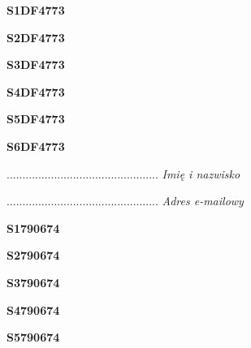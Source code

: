 \begin{turn}{90}\huge \textbf{S1DF4773}\end{turn}

\begin{turn}{90}\huge \textbf{S2DF4773}\end{turn}

\begin{turn}{90}\huge \textbf{S3DF4773}\end{turn}

\begin{turn}{90}\huge \textbf{S4DF4773}\end{turn}

\begin{turn}{90}\huge \textbf{S5DF4773}\end{turn}

\begin{turn}{90}\huge \textbf{S6DF4773}\end{turn}

\begin{turn}{90}\begin{minipage}{\linewidth} \vspace{20mm} ................................................  \textit{Imię i nazwisko}\end{minipage}\end{turn}

\begin{turn}{90}\begin{minipage}{\linewidth} \vspace{20mm} ................................................  \textit{Adres e-mailowy}\end{minipage}\end{turn}

\begin{turn}{90}\huge \textbf{S1790674}\end{turn}

\begin{turn}{90}\huge \textbf{S2790674}\end{turn}

\begin{turn}{90}\huge \textbf{S3790674}\end{turn}

\begin{turn}{90}\huge \textbf{S4790674}\end{turn}

\begin{turn}{90}\huge \textbf{S5790674}\end{turn}

